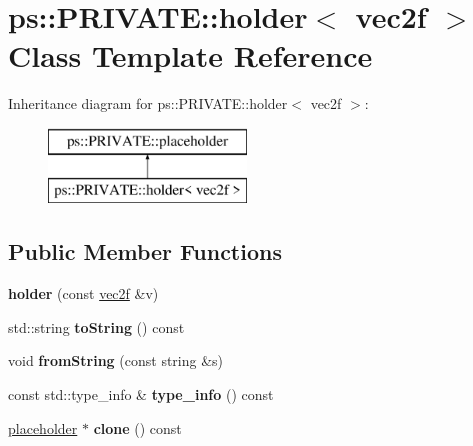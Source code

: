 \hypertarget{classps_1_1PRIVATE_1_1holder_3_01vec2f_01_4}{}\section{ps\+:\+:P\+R\+I\+V\+A\+T\+E\+:\+:holder$<$ vec2f $>$ Class Template Reference}
\label{classps_1_1PRIVATE_1_1holder_3_01vec2f_01_4}
Inheritance diagram for ps\+:\+:P\+R\+I\+V\+A\+T\+E\+:\+:holder$<$ vec2f $>$\+:\begin{figure}[H]
\begin{center}
\leavevmode
\includegraphics[height=2.000000cm]{classps_1_1PRIVATE_1_1holder_3_01vec2f_01_4}
\end{center}
\end{figure}
\subsection*{Public Member Functions}
\begin{DoxyCompactItemize}
\item 
\hypertarget{classps_1_1PRIVATE_1_1holder_3_01vec2f_01_4_a6738d9adcd60ced6543e16019dadf749}{}{\bfseries holder} (const \hyperlink{classps_1_1base_1_1Vec2}{vec2f} \&v)\label{classps_1_1PRIVATE_1_1holder_3_01vec2f_01_4_a6738d9adcd60ced6543e16019dadf749}

\item 
\hypertarget{classps_1_1PRIVATE_1_1holder_3_01vec2f_01_4_a0eeba4bcd65b6867eec4eafcb4712d45}{}std\+::string {\bfseries to\+String} () const \label{classps_1_1PRIVATE_1_1holder_3_01vec2f_01_4_a0eeba4bcd65b6867eec4eafcb4712d45}

\item 
\hypertarget{classps_1_1PRIVATE_1_1holder_3_01vec2f_01_4_aef8835c0de6f35a130aa8f50c67d64b0}{}void {\bfseries from\+String} (const string \&s)\label{classps_1_1PRIVATE_1_1holder_3_01vec2f_01_4_aef8835c0de6f35a130aa8f50c67d64b0}

\item 
\hypertarget{classps_1_1PRIVATE_1_1holder_3_01vec2f_01_4_a172a09ffff2fbcb45f22b08396f65bb3}{}const std\+::type\+\_\+info \& {\bfseries type\+\_\+info} () const \label{classps_1_1PRIVATE_1_1holder_3_01vec2f_01_4_a172a09ffff2fbcb45f22b08396f65bb3}

\item 
\hypertarget{classps_1_1PRIVATE_1_1holder_3_01vec2f_01_4_a06db4ced260049445e61d5b19b3491ef}{}\hyperlink{classps_1_1PRIVATE_1_1placeholder}{placeholder} $\ast$ {\bfseries clone} () const \label{classps_1_1PRIVATE_1_1holder_3_01vec2f_01_4_a06db4ced260049445e61d5b19b3491ef}

\end{DoxyCompactItemize}
